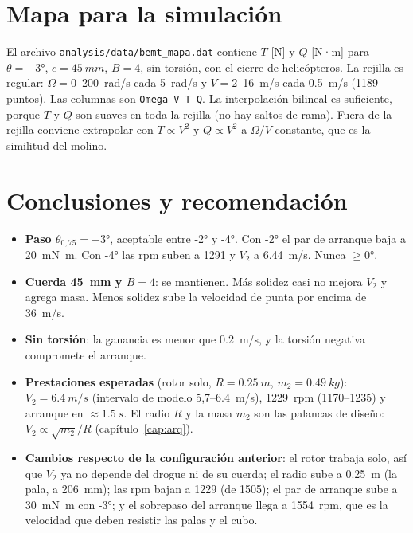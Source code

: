 \section{Mapa para la simulación}\label{sec:bemt-mapa}

El archivo \texttt{analysis/data/bemt\_mapa.dat} contiene $T$ [N] y $Q$ [N·m] para
$\theta=\ang{-3}$, $c=\SI{45}{mm}$, $B=4$, sin torsión, con el cierre de helicópteros. La
rejilla es regular: $\Omega=0$--\SI{200}{rad/s} cada \SI{5}{rad/s} y $V=2$--\SI{16}{m/s}
cada \SI{0.5}{m/s} (\num{1189} puntos). Las columnas son \texttt{Omega V T Q}. La
interpolación bilineal es suficiente, porque $T$ y $Q$ son suaves en toda la rejilla (no
hay saltos de rama). Fuera de la rejilla conviene extrapolar con $T\propto V^2$ y
$Q\propto V^2$ a $\Omega/V$ constante, que es la similitud del molino.

\section{Conclusiones y recomendación}\label{sec:bemt-concl}

\begin{resultado}
\begin{itemize}
  \item \textbf{Paso $\theta_{0,75}=\ang{-3}$}, aceptable entre \ang{-2} y \ang{-4}.
        Con \ang{-2} el par de arranque baja a \SI{20}{mN.m}. Con \ang{-4} las rpm suben
        a \num{1291} y $V_2$ a \SI{6.44}{m/s}. Nunca $\ge\ang{0}$.
  \item \textbf{Cuerda \SI{45}{mm} y $B=4$}: se mantienen. Más solidez casi no mejora
        $V_2$ y agrega masa. Menos solidez sube la velocidad de punta por encima de
        \SI{36}{m/s}.
  \item \textbf{Sin torsión}: la ganancia es menor que \SI{0.2}{m/s}, y la torsión
        negativa compromete el arranque.
  \item \textbf{Prestaciones esperadas} (rotor solo, $R=\SI{0.25}{m}$, $m_2=\SI{0.49}{kg}$):
        $V_2=\SI{6.4}{m/s}$ (intervalo de modelo 5,7--\SI{6.4}{m/s}), \num{1229}~rpm
        (\num{1170}--\num{1235}) y arranque en $\approx\SI{1.5}{s}$. El radio $R$ y la masa
        $m_2$ son las palancas de diseño: $V_2\propto\sqrt{m_2}/R$ (capítulo~\ref{cap:arq}).
  \item \textbf{Cambios respecto de la configuración anterior}: el rotor trabaja solo, así
        que $V_2$ ya no depende del drogue ni de su cuerda; el radio sube a \SI{0.25}{m}
        (la pala, a \SI{206}{mm}); las rpm bajan a \num{1229} (de \num{1505}); el par de
        arranque sube a \SI{30}{mN.m} con \ang{-3}; y el sobrepaso del arranque llega a
        \num{1554}~rpm, que es la velocidad que deben resistir las palas y el cubo.
\end{itemize}
\end{resultado}

